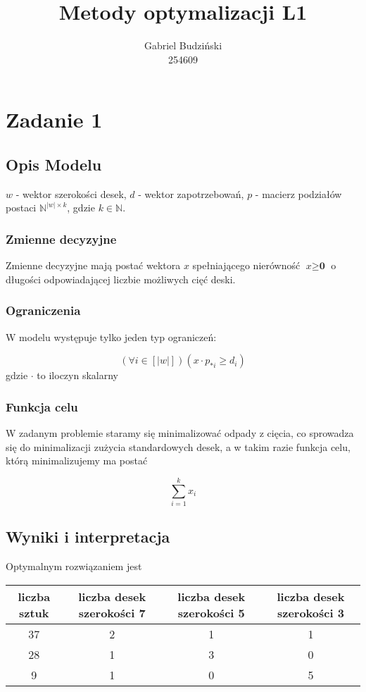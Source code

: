 \documentclass{article}
\title{Metody optymalizacji L1}
\author{Gabriel Budziński\\254609}
\begin{document}
\maketitle

\section{Zadanie 1}
\subsection{Opis Modelu}
$w$ - wektor szerokości desek, $d$ - wektor zapotrzebowań, $p$ - macierz podziałów postaci $\mathbb{N}^{|w|\times k}$, gdzie $k \in \mathbb{N}$.
\subsubsection{Zmienne decyzyjne}
Zmienne decyzyjne mają postać wektora $\textit{x}$ spełniającego nierówność $\textit{x} \geq \textbf{0}$ o długości odpowiadającej liczbie możliwych cięć deski.
\subsubsection{Ograniczenia}
W modelu występuje tylko jeden typ ograniczeń:

\[(\forall i \in [|w|]) \left(\textit{x} \cdot p_{*i} \geq d_i\right)\]
gdzie $\cdot$ to iloczyn skalarny

\subsubsection{Funkcja celu}
W zadanym problemie staramy się minimalizować odpady z cięcia, co sprowadza się do minimalizacji zużycia standardowych desek, a w takim razie funkcja celu, którą minimalizujemy ma postać

\[\sum_{i = 1}^{k}{\textit{x}_i}\]

\subsection{Wyniki i interpretacja}

Optymalnym rozwiązaniem jest

\begin{table}[H]
	\centering
	\begin{tabular}{c|c|c|c}
		liczba sztuk & liczba desek szerokości 7 & liczba desek szerokości 5 & liczba desek szerokości 3\\\hline
		37 & 2 & 1 & 1\\\hline
		28 & 1 & 3 & 0\\\hline
		9 & 1 & 0 & 5\\\hline
	\end{tabular}
\end{table}
\end{document}
